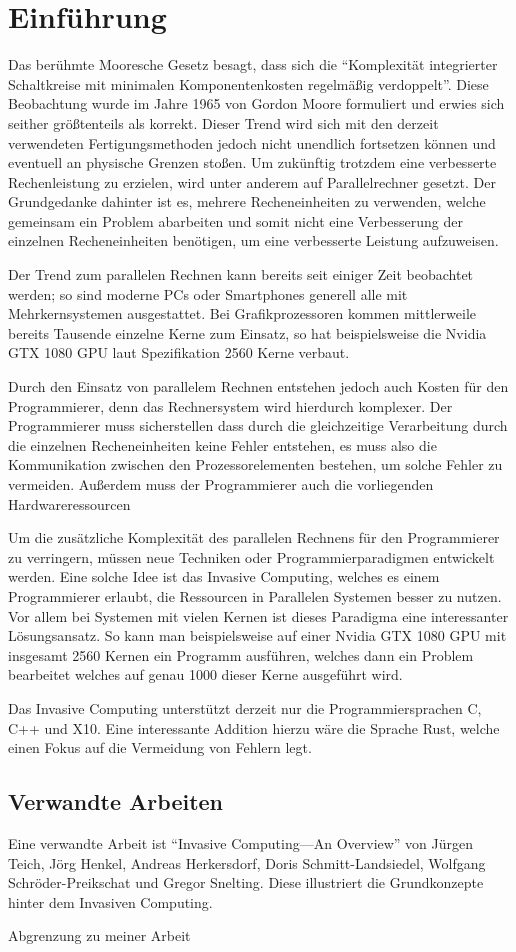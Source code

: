 \chapter{Einführung}\label{sec:intro}

Das berühmte Mooresche Gesetz besagt, dass sich die 
``Komplexität integrierter Schaltkreise mit minimalen Komponentenkosten regelmäßig verdoppelt''\cite{mooresLawWikiDe}.
Diese Beobachtung wurde im Jahre 1965 von Gordon Moore formuliert und erwies sich seither größtenteils als korrekt.
Dieser Trend wird sich mit den derzeit verwendeten Fertigungsmethoden jedoch nicht unendlich fortsetzen können und eventuell an
physische Grenzen stoßen. Um zukünftig trotzdem eine verbesserte Rechenleistung zu erzielen, wird unter anderem auf
Parallelrechner gesetzt. Der Grundgedanke dahinter ist es, mehrere Recheneinheiten zu verwenden, welche gemeinsam ein Problem
abarbeiten und somit nicht eine Verbesserung der einzelnen Recheneinheiten benötigen, um eine verbesserte Leistung aufzuweisen.

Der Trend zum parallelen Rechnen kann bereits seit einiger Zeit beobachtet werden; so sind moderne PCs oder Smartphones
generell alle mit Mehrkernsystemen ausgestattet. Bei Grafikprozessoren kommen mittlerweile bereits Tausende einzelne Kerne
zum Einsatz, so hat beispielsweise die Nvidia GTX 1080 GPU laut Spezifikation \cite{nvidia1080specs} 2560 Kerne verbaut.

Durch den Einsatz von parallelem Rechnen entstehen jedoch auch Kosten für den Programmierer, denn das Rechnersystem wird
hierdurch komplexer. Der Programmierer muss sicherstellen dass durch die gleichzeitige Verarbeitung durch die einzelnen
Recheneinheiten keine Fehler entstehen, es muss also die Kommunikation zwischen den Prozessorelementen bestehen, um solche
Fehler zu vermeiden. Außerdem muss der Programmierer auch die vorliegenden Hardwareressourcen

Um die zusätzliche Komplexität des parallelen Rechnens für den Programmierer zu verringern, müssen neue Techniken oder
Programmierparadigmen entwickelt werden. Eine solche Idee ist das Invasive Computing, welches es einem Programmierer
erlaubt, die Ressourcen in Parallelen Systemen besser zu nutzen. Vor allem bei Systemen mit vielen Kernen ist dieses Paradigma
eine interessanter Lösungsansatz. So kann man beispielsweise auf einer Nvidia GTX 1080 GPU mit insgesamt 2560 Kernen ein Programm
ausführen, welches dann ein Problem bearbeitet welches auf genau 1000 dieser Kerne ausgeführt wird.

Das Invasive Computing unterstützt derzeit nur die Programmiersprachen C, C++ und X10. Eine interessante Addition hierzu wäre
die Sprache Rust, welche einen Fokus auf die Vermeidung von Fehlern legt.

\section{Verwandte Arbeiten}

Eine verwandte Arbeit ist ``Invasive Computing—An Overview'' von Jürgen Teich, Jörg Henkel, Andreas Herkersdorf, Doris Schmitt-Landsiedel, Wolfgang Schröder-Preikschat und Gregor Snelting. Diese illustriert die Grundkonzepte hinter dem Invasiven Computing.

Abgrenzung zu meiner Arbeit